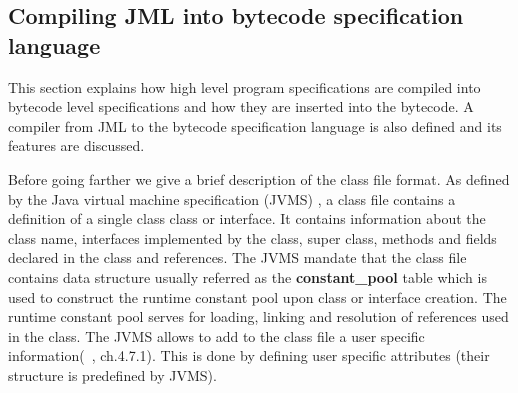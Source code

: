  
\subsection{Compiling JML into bytecode specification language}\label{comJML}

This section explains how high level program specifications are compiled into bytecode level specifications and how they are inserted into the bytecode. 
 A compiler from JML to the bytecode specification language is also defined and its features are discussed.


Before going farther we give a brief description of the class file format. As defined by the Java virtual machine  specification (JVMS) \cite{VMSpec}, a class file contains a definition of a single class class or interface. It contains information about the class name, interfaces implemented by the class, super class, methods and fields declared in the class and references. The JVMS mandate that the class file contains data structure usually referred as the \textbf{constant\_pool} table which is used to construct the runtime constant pool upon class or interface creation. The runtime constant pool serves for loading, linking and resolution of references used in the class. The JVMS allows to add to the class file a user specific information(~\cite{VMSpec}, ch.4.7.1). This is done by defining user specific attributes  (their structure is predefined by JVMS).

